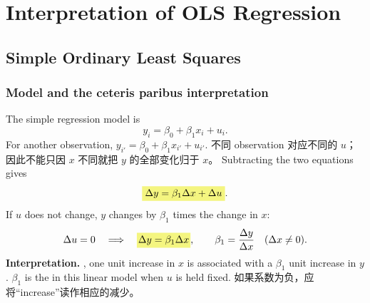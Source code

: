 \chapter{Interpretation of OLS Regression}
\label{ch:week2}
\section{Simple Ordinary Least Squares}
\label{sec:simple-interpretation}
\subsection{Model and the ceteris paribus interpretation}
The simple regression model is
\begin{equation}\label{eq:simple-model}
 y_i=\beta_0+\beta_1x_i+u_i.
\end{equation}
For another observation, $y_{i'}=\beta_0+\beta_1x_{i'}+u_{i'}$. 不同 observation 对应不同的 $u$；因此不能只因 $x$ 不同就把 $y$ 的全部变化归于 $x$。
Subtracting the two equations gives
\[\hm{\Delta y=\beta_1\Delta x+\Delta u}.\]
If $u$ does not change, $y$ changes by $\beta_1$ times the change in $x$:
\[\Delta u=0\quad\Longrightarrow\quad
\hy{$\Delta y=\beta_1\Delta x$},\qquad
\beta_1=\frac{\Delta y}{\Delta x}\quad(\Delta x\ne0).\]
\textbf{Interpretation.} , one unit increase in $x$ is associated with a $\beta_1$ unit increase in $y$. $\beta_1$ is the  in this linear model when $u$ is held fixed. 如果系数为负，应将“increase”读作相应的减少。

